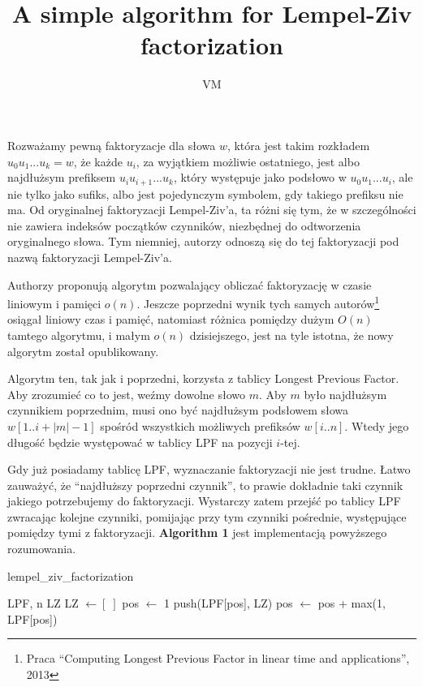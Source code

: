 \documentclass[a4paper,12pt]{article}
\title{A simple algorithm for Lempel-Ziv factorization}
\author{VM}
\theoremstyle{definition}
\begin{document}
\maketitle

Rozważamy pewną faktoryzacje dla słowa $w$, która jest takim rozkładem $u_0 u_1 ... u_k = w$,
 że każde $u_i$, za wyjątkiem możliwie ostatniego,
 jest albo najdłużsym prefiksem $u_i u_{i + 1} ... u_k$, który występuje jako podsłowo w $u_0 u_1 ... u_i$,
 ale nie tylko jako sufiks,
 albo jest pojedynczym symbolem, gdy takiego prefiksu nie ma.
Od oryginalnej faktoryzacji Lempel-Ziv'a, ta różni się tym, 
 że w szczególności nie zawiera indeksów początków czynników,
 niezbędnej do odtworzenia oryginalnego słowa.
Tym niemniej, autorzy odnoszą się do tej faktoryzacji pod nazwą faktoryzacji Lempel-Ziv'a.

Authorzy proponują algorytm pozwalający obliczać faktoryzację w czasie liniowym i pamięci $o(n)$.
Jeszcze poprzedni wynik tych samych autorów\footnote{Praca ``Computing Longest Previous Factor in linear time and applications'', 2013} osiągał liniowy czas i pamięć,
 natomiast różnica pomiędzy dużym $O(n)$ tamtego algorytmu, i małym $o(n)$ dzisiejszego, jest na tyle istotna,
 że nowy algorytm został opublikowany.

Algorytm ten, tak jak i poprzedni, korzysta z tablicy Longest Previous Factor.
Aby zrozumieć co to jest, weźmy dowolne słowo $m$.
Aby $m$ było najdłużsym czynnikiem poprzednim,
 musi ono być najdłużsym podsłowem słowa $w[1..i + |m| - 1]$ spośród wszystkich możliwych prefiksów $w[i..n]$.
Wtedy jego długość będzie występować w tablicy LPF na pozycji $i$-tej.

Gdy już posiadamy tablicę LPF, wyznaczanie faktoryzacji nie jest trudne.
Łatwo zauważyć, że ``najdłuższy poprzedni czynnik'', to prawie dokładnie taki czynnik jakiego potrzebujemy do faktoryzacji.
Wystarczy zatem przejść po tablicy LPF zwracając kolejne czynniki,
 pomijając przy tym czynniki pośrednie, występujące pomiędzy tymi z faktoryzacji.
\textbf{Algorithm 1} jest implementacją powyższego rozumowania.

\begin{algorithm}
\caption{lempel\_ziv\_factorization}
\begin{algorithmic}
\REQUIRE LPF, n
\ENSURE LZ
\STATE LZ $\gets [\;]$
\STATE pos $\gets$ 1
\STATE push(LPF[pos], LZ)
\STATE pos $\gets$ pos + max(1, LPF[pos])
\ENDWHILE
\end{algorithmic}
\end{algorithm}
\end{document}
